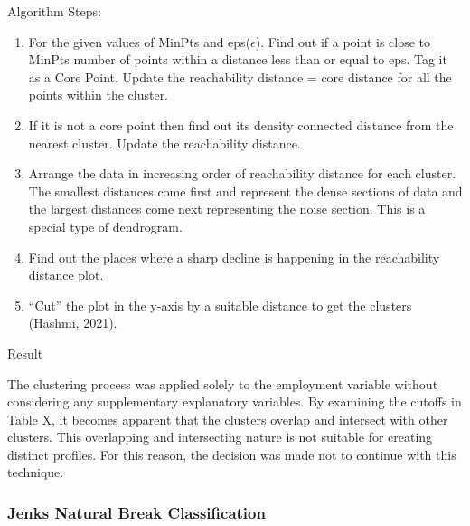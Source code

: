 \documentclass[11pt, a4paper]{article}
\begin{document}
Algorithm Steps:
\begin{enumerate}
\item For the given values of MinPts and eps($\epsilon$). Find out if a point is close to MinPts number of points within a distance less than or equal to eps. Tag it as a Core Point. Update the reachability distance = core distance for all the points within the cluster.
\item If it is not a core point then find out its density connected distance from the nearest cluster. Update the reachability distance.
\item Arrange the data in increasing order of reachability distance for each cluster. The smallest distances come first and represent the dense sections of data and the largest distances come next representing the noise section. This is a special type of dendrogram.
\item Find out the places where a sharp decline is happening in the reachability distance plot.
\item ``Cut'' the plot in the y-axis by a suitable distance to get the clusters (Hashmi, 2021).
\end{enumerate}

Result



The clustering process was applied solely to the employment variable without considering any supplementary explanatory variables. By examining the cutoffs in Table X, it becomes apparent that the clusters overlap and intersect with other clusters. This overlapping and intersecting nature is not suitable for creating distinct profiles. For this reason, the decision was made not to continue with this technique.






\subsubsection{Jenks Natural Break Classification}
\end{document}

